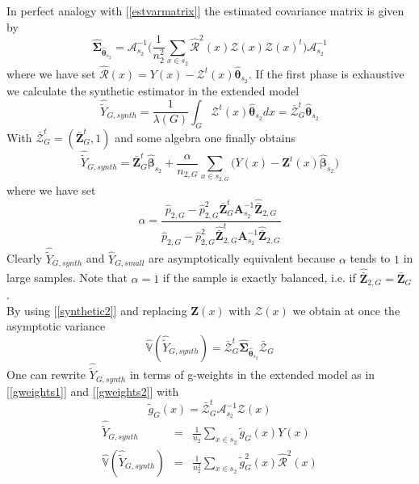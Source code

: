 \documentclass[a4paper,12pt,leqno, titlepage]{article}
\newcommand{\VAR}{\mathbb{V}}
\begin{document}
In perfect analogy with [\ref{estvarmatrix}] the estimated covariance matrix is given by
\begin{equation}\label{estvarmatrixext}
\hat{\pmb{\Sigma}}_{\hat{\pmb{\theta}}_{s_2}}=\pmb{\mathcal{A}}_{s_2}^{-1}
\Big(\frac{1}{n_2^2}\sum_{x\in{s_2}}\hat{\mathcal{R}}^2(x)\pmb{\mathcal{Z}}(x)
\pmb{\mathcal{Z}}(x)^t\Big)\pmb{\mathcal{A}}_{s_2}^{-1}
\end{equation}
where we have set $\hat{\mathcal{R}}(x)=Y(x)-\pmb{\mathcal{Z}}^t(x)\hat{\pmb{\theta}}_{s_2}$.
If the first phase is exhaustive we calculate the synthetic estimator in the extended model
\begin{equation}\label{extsynthethic1}
\hat{\tilde{Y}}_{G,synth}=
\frac{1}{\lambda(G)}\int_G\pmb{\mathcal{Z}}^t(x)\hat{\pmb{\theta}}_{s_2}dx
=\bar{\pmb{\mathcal{Z}}}^t_{G}\hat{\pmb{\theta}}_{s_2}
\end{equation}
With $\bar{\pmb{\mathcal{Z}}}^t_{G}=(\bar{\pmb{Z}}^t_{G},1)$ and some algebra one finally obtains
\begin{equation}\label{extsynthethic2}
\hat{\tilde{Y}}_{G,synth}=\bar{\pmb{Z}}_{G}^t\hat{\pmb{\beta}}_{s_2}+
\frac{\alpha}{n_{2,G}}\sum_{x\in{s_{2,G}}}\big(Y(x)-\pmb{Z}^t(x)\hat{\pmb{\beta}}_{s_2}\big)
\end{equation}
where we have set
$$\alpha=\frac{\hat{p}_{2,G}-\hat{p}^2_{2,G}\bar{\pmb{Z}}_{G}^t\pmb{A}^{-1}_{s_2}\hat{\bar{\pmb{Z}}}_{2,G}}
{\hat{p}_{2,G}-\hat{p}^2_{2,G}\hat{\bar{\pmb{Z}}}_{2,G}^t\pmb{A}^{-1}_{s_2}\hat{\bar{\pmb{Z}}}_{2,G}}$$
Clearly $\hat{\tilde{Y}}_{G,synth}$ and
$\hat{{Y}}_{G,small}$ are asymptotically equivalent because $\alpha$ tends to $1$ in large samples. Note that $\alpha=1$ if the sample is exactly balanced, i.e. if $\hat{\bar{\pmb{Z}}}_{2,G}= \bar{\pmb{Z}}_{G}$.\\
By using [\ref{synthetic2}] and replacing $\pmb{Z}(x)$ with $\pmb{\mathcal{Z}}(x)$ we obtain at once the asymptotic variance
\begin{equation}\label{extsynthetic1var}
\hat{\VAR}(\hat{\tilde{Y}}_{G,synth})=
\bar{\pmb{\mathcal{Z}}}^t_{G}\hat{\pmb{\Sigma}}_{\hat{\pmb{\theta}}_{s_2}}\bar{\pmb{\mathcal{Z}}}_{G}
\end{equation}
One can rewrite $\hat{\tilde{Y}}_{G,synth}$ in terms of g-weights in the extended model as in [\ref{gweights1}] and [\ref{gweights2}] with
$$\tilde{g}_{G}(x)=\bar{\pmb{\mathcal{Z}}}_G^t\pmb{\mathcal{A}}^{-1}_{s_2}\pmb{\mathcal{Z}}(x)$$
 \begin{eqnarray}\label{gweightsynthextended}
 \hat{\tilde{Y}}_{G,synth}&=&\frac{1}{n_2}\sum_{x\in{s_2}}\tilde{g}_{G}(x)Y(x) \nonumber \\
 \hat{\VAR}(\hat{\tilde{Y}}_{G,synth})&=&\frac{1}{n^2_2}\sum_{x\in{s_2}}\tilde{g}^2_{G}(x)\hat{\mathcal{R}}^2(x)
 \end{eqnarray}
\end{document}
